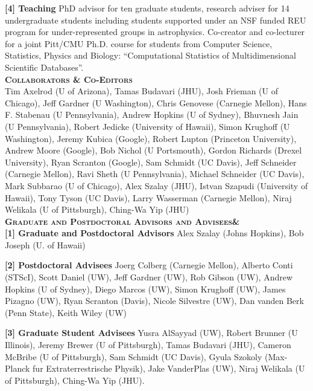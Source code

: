 \documentclass[12pt,tightenlines]{revtex4} %
\begin{document}
\noindent 
{\bf [4] Teaching } PhD advisor for ten graduate students, research
adviser for 14 undergraduate students including students supported
under an NSF funded REU program for under-represented groups in
astrophysics. Co-creator and co-lecturer for a joint Pitt/CMU
Ph.D. course for students from Computer Science, Statistics, Physics
and Biology: ``Computational Statistics of Multidimensional Scientific
Databases''.\\



\noindent
{\bf \scshape Collaborators \& Co-Editors} \\
\noindent
Tim
Axelrod (U of Arizona), Tamas Budavari
(JHU), Josh Frieman (U of Chicago), Jeff
Gardner (U Washington), Chris Genovese (Carnegie Mellon), Hans F. Stabenau (U Pennsylvania), Andrew Hopkins (U of
Sydney), Bhuvnesh Jain (U Pennsylvania), Robert Jedicke (University of
Hawaii), Simon Krughoff (U Washington), Jeremy Kubica (Google), Robert
Lupton (Princeton University), Andrew Moore (Google), Bob Nichol (U
Portsmouth), Gordon Richards (Drexel
University), Ryan Scranton (Google), Sam Schmidt (UC Davis), Jeff
Schneider (Carnegie Mellon), Ravi Sheth (U Pennsylvania), Michael Schneider (UC Davis),
Mark Subbarao (U of Chicago), Alex Szalay (JHU), Istvan
Szapudi (University of Hawaii),
Tony Tyson (UC Davis), Larry Wasserman (Carnegie Mellon), Niraj
Welikala (U of Pittsburgh), Ching-Wa Yip (JHU)\\

\noindent
{\bf \scshape Graduate and Postdoctoral Advisors and Advisees\&} \\
\noindent
{\bf [1] Graduate and Postdoctoral Advisors}
\noindent
Alex Szalay (Johns
Hopkins), Bob Joseph (U. of Hawaii)

\noindent
{\bf [2] Postdoctoral Advisees}
Joerg Colberg
(Carnegie Mellon), Alberto Conti
(STScI), Scott Daniel (UW), Jeff Gardner (UW), Rob Gibson (UW), Andrew
Hopkins (U of Sydney), Diego Marcos (UW), Simon Krughoff (UW), James Pizagno (UW), Ryan Scranton (Davis),  Nicole Silvestre (UW), Dan vanden Berk (Penn State), Keith Wiley (UW)


\noindent
{\bf [3] Graduate Student Advisees}
 Yusra AlSayyad (UW), Robert
Brunner (U Illinois), Jeremy Brewer (U of
Pittsburgh), Tamas Budavari (JHU), Cameron McBribe (U of Pittsburgh), Sam Schmidt
(UC Davis), Gyula Szokoly (Max-Planck fur
Extraterrestrische Physik), Jake VanderPlas (UW), 
Niraj Welikala (U of Pittsburgh), Ching-Wa Yip (JHU).
\end{document}
